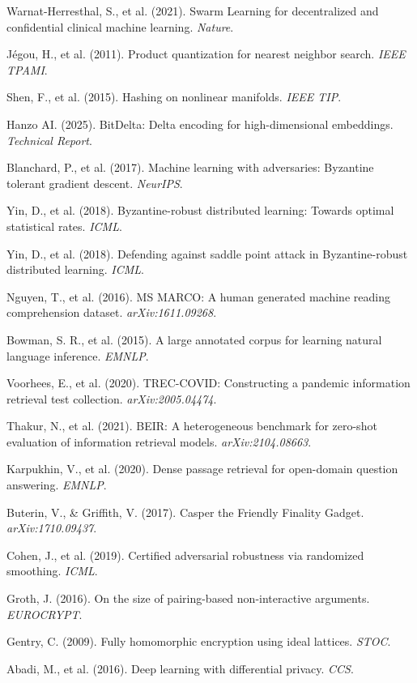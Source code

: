 \documentclass[11pt,a4paper]{article}
\begin{document}
\begin{thebibliography}{99}
Warnat-Herresthal, S., et al. (2021). Swarm Learning for decentralized and confidential clinical machine learning. \textit{Nature}.

Jégou, H., et al. (2011). Product quantization for nearest neighbor search. \textit{IEEE TPAMI}.

Shen, F., et al. (2015). Hashing on nonlinear manifolds. \textit{IEEE TIP}.

Hanzo AI. (2025). BitDelta: Delta encoding for high-dimensional embeddings. \textit{Technical Report}.

Blanchard, P., et al. (2017). Machine learning with adversaries: Byzantine tolerant gradient descent. \textit{NeurIPS}.

Yin, D., et al. (2018). Byzantine-robust distributed learning: Towards optimal statistical rates. \textit{ICML}.

Yin, D., et al. (2018). Defending against saddle point attack in Byzantine-robust distributed learning. \textit{ICML}.

Nguyen, T., et al. (2016). MS MARCO: A human generated machine reading comprehension dataset. \textit{arXiv:1611.09268}.

Bowman, S. R., et al. (2015). A large annotated corpus for learning natural language inference. \textit{EMNLP}.

Voorhees, E., et al. (2020). TREC-COVID: Constructing a pandemic information retrieval test collection. \textit{arXiv:2005.04474}.

Thakur, N., et al. (2021). BEIR: A heterogeneous benchmark for zero-shot evaluation of information retrieval models. \textit{arXiv:2104.08663}.

Karpukhin, V., et al. (2020). Dense passage retrieval for open-domain question answering. \textit{EMNLP}.

Buterin, V., \& Griffith, V. (2017). Casper the Friendly Finality Gadget. \textit{arXiv:1710.09437}.

Cohen, J., et al. (2019). Certified adversarial robustness via randomized smoothing. \textit{ICML}.

Groth, J. (2016). On the size of pairing-based non-interactive arguments. \textit{EUROCRYPT}.

Gentry, C. (2009). Fully homomorphic encryption using ideal lattices. \textit{STOC}.

Abadi, M., et al. (2016). Deep learning with differential privacy. \textit{CCS}.

\end{thebibliography}
\end{document}
